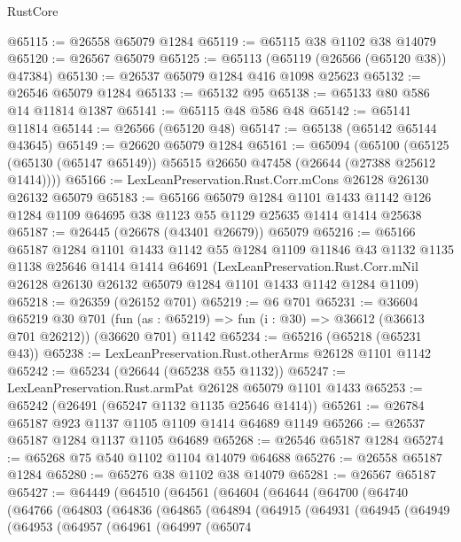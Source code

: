 \begin{lexlean}{RustCore}
\begin{coremodule}
@65115 := @26558 @65079 @1284
@65119 := @65115 @38 @1102 @38 @14079
@65120 := @26567 @65079
@65125 := @65113 (@65119 (@26566 (@65120 @38)) @47384)
@65130 := @26537 @65079 @1284 @416 @1098 @25623
@65132 := @26546 @65079 @1284
@65133 := @65132 @95
@65138 := @65133 @80 @586 @14 @11814 @1387
@65141 := @65115 @48 @586 @48
@65142 := @65141 @11814
@65144 := @26566 (@65120 @48)
@65147 := @65138 (@65142 @65144 @43645)
@65149 := @26620 @65079 @1284
@65161 := @65094
    (@65100 (@65125 (@65130 (@65147 @65149)) @56515 @26650 @47458 (@26644 (@27388 @25612 @1414))))
@65166 := LexLeanPreservation.Rust.Corr.mCons @26128 @26130 @26132 @65079
@65183 := @65166
    @65079
    @1284
    @1101
    @1433
    @1142
    @126
    @1284
    @1109
    @64695
    @38
    @1123
    @55
    @1129
    @25635
    @1414
    @1414
    @25638
@65187 := @26445 (@26678 (@43401 @26679)) @65079
@65216 := @65166
    @65187
    @1284
    @1101
    @1433
    @1142
    @55
    @1284
    @1109
    @11846
    @43
    @1132
    @1135
    @1138
    @25646
    @1414
    @1414
    @64691
    (LexLeanPreservation.Rust.Corr.mNil
      @26128
      @26130
      @26132
      @65079
      @1284
      @1101
      @1433
      @1142
      @1284
      @1109)
@65218 := @26359 (@26152 @701)
@65219 := @6 @701
@65231 := @36604
    @65219
    @30
    @701
    (fun (as : @65219) => fun (i : @30) => @36612 (@36613 @701 @26212))
    (@36620 @701)
    @1142
@65234 := @65216 (@65218 (@65231 @43))
@65238 := LexLeanPreservation.Rust.otherArms @26128 @1101 @1142
@65242 := @65234 (@26644 (@65238 @55 @1132))
@65247 := LexLeanPreservation.Rust.armPat @26128 @65079 @1101 @1433
@65253 := @65242 (@26491 (@65247 @1132 @1135 @25646 @1414))
@65261 := @26784 @65187 @923 @1137 @1105 @1109 @1414 @64689 @1149
@65266 := @26537 @65187 @1284 @1137 @1105 @64689
@65268 := @26546 @65187 @1284
@65274 := @65268 @75 @540 @1102 @1104 @14079 @64688
@65276 := @26558 @65187 @1284
@65280 := @65276 @38 @1102 @38 @14079
@65281 := @26567 @65187
@65427 := @64449
    (@64510
      (@64561
        (@64604
          (@64644
            (@64700
              (@64740
                (@64766
                  (@64803
                    (@64836
                      (@64865
                        (@64894
                          (@64915
                            (@64931
                              (@64945
                                (@64949
                                  (@64953
                                    (@64957
                                      (@64961
                                        (@64997
                                          (@65074

\end{coremodule}
\end{lexlean}
